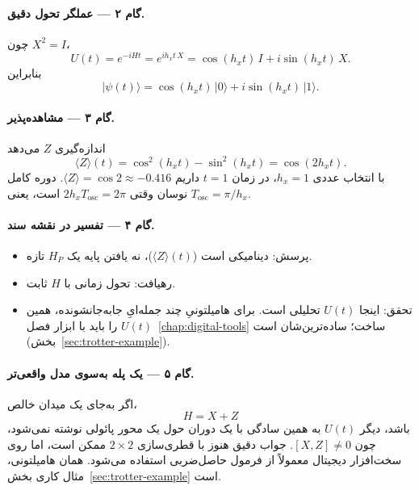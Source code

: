 \paragraph{گام ۲ --- عملگر تحول دقیق.}
چون $X^2=I$،
\begin{equation}
	U(t)=e^{-iHt}=e^{i h_x t\, X}
	=
	\cos(h_x t)\,I
	+
	i\sin(h_x t)\,X.
\end{equation}
بنابراین
\begin{equation}
	\lvert\psi(t)\rangle
	=
	\cos(h_x t)\,\lvert0\rangle
	+
	i\sin(h_x t)\,\lvert1\rangle.
\end{equation}

\paragraph{گام ۳ --- مشاهده‌پذیر.}
اندازه‌گیری $Z$ می‌دهد
\begin{equation}
	\label{eq:rabi-Z}
	\langle Z\rangle(t)
	=
	\cos^2(h_x t)-\sin^2(h_x t)
	=
	\cos(2 h_x t).
\end{equation}
با انتخاب عددی $h_x=1$، در زمان $t=1$ داریم $\langle Z\rangle=\cos 2\approx -0.416$. دوره کامل نوسان وقتی $2h_x T_{\mathrm{osc}}=2\pi$ است، یعنی $T_{\mathrm{osc}}=\pi/h_x$.

\paragraph{گام ۴ --- تفسیر در نقشه سند.}
\begin{itemize}
	\item پرسش: دینامیکی است ($\langle Z\rangle(t)$)، نه یافتن پایه یک $H_P$ تازه.
	\item رهیافت: تحول زمانی با $H$ ثابت.
	\item تحقق: اینجا $U(t)$ تحلیلی است. برای هامیلتونیِ چند جمله‌ایِ جابه‌جانشونده، همین $U(t)$ را باید با ابزار فصل~\ref{chap:digital-tools} ساخت؛ ساده‌ترین‌شان  است (بخش~\ref{sec:trotter-example}).
\end{itemize}

\paragraph{گام ۵ --- یک پله به‌سوی مدل واقعی‌تر.}
اگر به‌جای یک میدان خالص،
\begin{equation}
	H=X+Z
\end{equation}
باشد، دیگر $U(t)$ به همین سادگی با یک دوران حول یک محور پائولی نوشته نمی‌شود، چون $[X,Z]\neq 0$. جواب دقیق هنوز با قطری‌سازی $2\times2$ ممکن است، اما روی سخت‌افزار دیجیتال معمولاً از فرمول حاصل‌ضربی استفاده می‌شود. همان هامیلتونی، مثال کاری بخش~\ref{sec:trotter-example} است.

